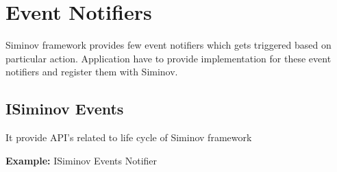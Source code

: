 \newpage
\chapter {\Large{Event Notifiers}}

Siminov framework provides few event notifiers which gets triggered based on particular action. Application have to provide implementation for these event notifiers and register them with Siminov.

\section{ISiminov Events} It provide API's related to life cycle of Siminov framework

		\par
		\textbf{Example:} ISiminov Events Notifier
			


